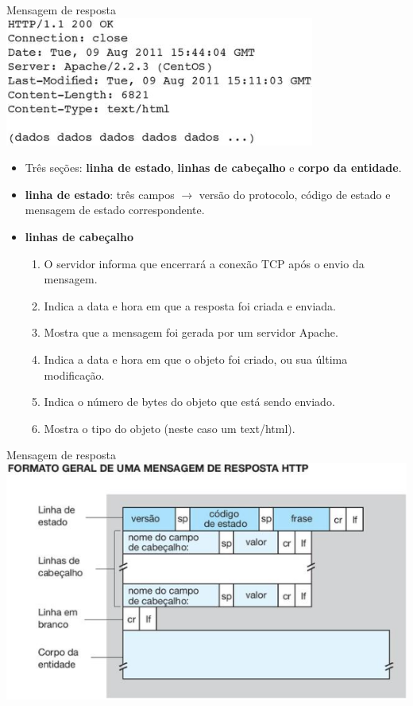 \documentclass{libs/ufc_format}
\begin{document}
\begin{frame}{Mensagem de resposta}
    \centering
    \includegraphics[scale=0.6]{figuras/figura04_05}
    \begin{itemize}
        \justifying
        \item Três seções: \textbf{linha de estado}, \textbf{linhas de cabeçalho} e \textbf{corpo da entidade}.
        \item \textbf{linha de estado}: três campos $\rightarrow$ versão do protocolo, código de estado e mensagem de estado correspondente.
        \item \textbf{linhas de cabeçalho}
            \begin{enumerate}
                \justifying
                \item O servidor informa que encerrará a conexão TCP após o envio da mensagem.
                \item Indica a data e hora em que a resposta foi criada e enviada.
                \item Mostra que a mensagem foi gerada por um servidor Apache.
                \item Indica a data e hora em que o objeto foi criado, ou sua última modificação.
                \item Indica o número de bytes do objeto que está sendo enviado.
                \item Mostra o tipo do objeto (neste caso um text/html).
            \end{enumerate}
    \end{itemize}
\end{frame}

\begin{frame}{Mensagem de resposta}
    \includegraphics[scale=0.7]{figuras/figura04_06}
\end{frame}
\end{document}
